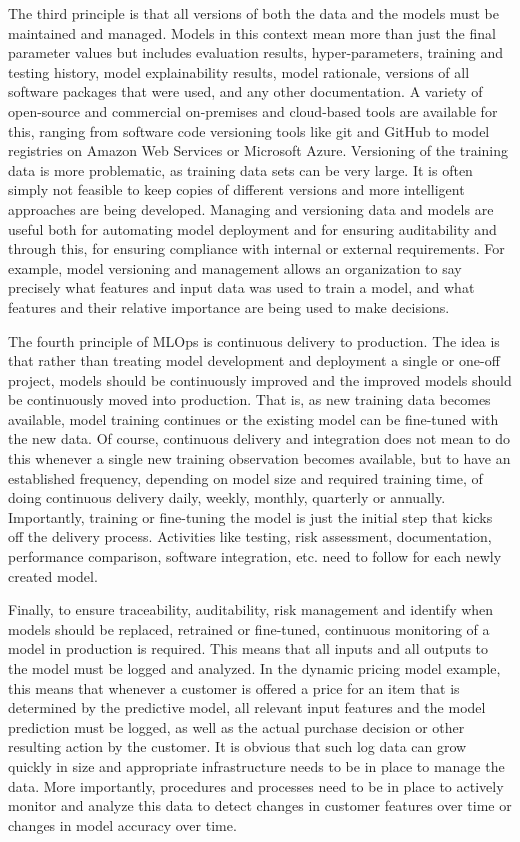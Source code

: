 The third principle is that all versions of both the data and the models must be maintained and managed. Models in this context mean more than just the final parameter values but includes evaluation results, hyper-parameters, training and testing history, model explainability results, model rationale, versions of all software packages that were used, and any other documentation. A variety of open-source and commercial on-premises and cloud-based tools are available for this, ranging from software code versioning tools like git and GitHub to model registries on Amazon Web Services or Microsoft Azure. Versioning of the training data is more problematic, as training data sets can be very large. It is often simply not feasible to keep copies of different versions and more intelligent approaches are being developed. Managing and versioning data and models are useful both for automating model deployment and for ensuring auditability and through this, for ensuring compliance with internal or external requirements. For example, model versioning and management allows an organization to say precisely what features and input data was used to train a model, and what features and their relative importance are being used to make decisions. 

The fourth principle of MLOps is continuous delivery to production. The idea is that rather than treating model development and deployment a single or one-off project, models should be continuously improved and the improved models should be continuously moved into production. That is, as new training data becomes available, model training continues or the existing model can be fine-tuned with the new data. Of course, continuous delivery and integration does not mean to do this whenever a single new training observation becomes available, but to have an established frequency, depending on model size and required training time, of doing continuous delivery daily, weekly, monthly, quarterly or annually. Importantly, training or fine-tuning the model is just the initial step that kicks off the delivery process. Activities like testing, risk assessment, documentation, performance comparison, software integration, etc. need to follow for each newly created model.

Finally, to ensure traceability, auditability, risk management and identify when models should be replaced, retrained or fine-tuned, continuous monitoring of a model in production is required. This means that all inputs and all outputs to the model must be logged and analyzed. In the dynamic pricing model example, this means that whenever a customer is offered a price for an item that is determined by the predictive model, all relevant input features and the model prediction must be logged, as well as the actual purchase decision or other resulting action by the customer. It is obvious that such log data can grow quickly in size and appropriate infrastructure needs to be in place to manage the data. More importantly, procedures and processes need to be in place to actively monitor and analyze this data to detect changes in customer features over time or changes in model accuracy over time. 

